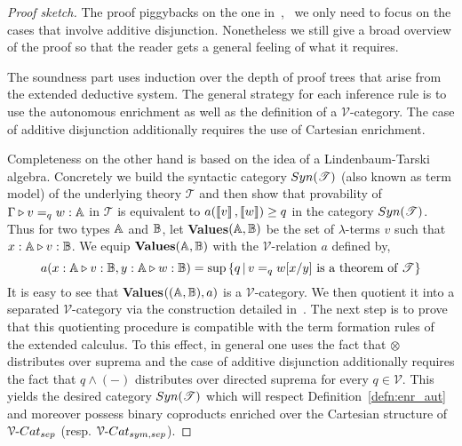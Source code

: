 \documentclass[a4paper,UKenglish,cleveref, autoref, thm-restate]{lipics-v2021}
\begin{document}
\begin{proof}[Proof sketch]
        The proof piggybacks on the one
        in~\cite{dahlqvist22,dahlqvist2023syntactic}, \ie\ we only
        need to focus on the cases that involve additive disjunction.
        Nonetheless we still give a broad overview of the proof so that the
        reader gets a general feeling of what it requires.

        The soundness part uses induction over the depth of proof trees that
        arise from the extended deductive system. The general strategy for each
        inference rule is to use the autonomous enrichment as well as the
        definition of a $\mathcal{V}$-category.  The case of additive
        disjunction additionally requires the use of Cartesian enrichment.

        Completeness on the other hand is based on the idea of a
        Lindenbaum-Tarski algebra. Concretely we build the syntactic category
        $\catfont{Syn}(\mathscr{T})$ (also known as term model) of the
        underlying  theory $\mathscr{T}$ and then show that provability of
        $\Gamma \triangleright v =_q w : \mathbb{A}$ in $\mathscr{T}$ is equivalent to
        $a(\left \llbracket v \right \rrbracket,\left \llbracket w \right \rrbracket) \geq q$ in the category
        $\catfont{Syn}(\mathscr{T})$. Thus for two types $\mathbb{A}$ and $\mathbb{B}$,
        let \textbf{Values}$(\mathbb{A},\mathbb{B})$ be the set of $\lambda$-terms $v$
        such that $x : \mathbb{A} \triangleright v : \mathbb{B}$. We equip
        $\textbf{Values}(\mathbb{A},\mathbb{B})$ with the $\mathcal{V}$-relation $a$
        defined by,
        \[
                        a(x : \mathbb{A} \triangleright v : \mathbb{B}, y : \mathbb{A} \triangleright  w : \mathbb{B})
                        =\sup {\{q \, \vert \,
                        v=_q w[x/y] \text{ is a theorem of } \mathscr{T} \}}
        \]
        It is easy to see that \textbf{Values}$((\mathbb{A},\mathbb{B}),a)$ is a
        $\mathcal{V}$-category. We then quotient it into a separated
        $\mathcal{V}$-category via the construction detailed
        in~\cite{dahlqvist22,dahlqvist2023syntactic}. The next step is to prove
        that this quotienting procedure is compatible with the term formation
        rules of the extended calculus. To this effect, in general one uses the
        fact that $\otimes$ distributes over suprema and the case of additive
        disjunction additionally requires the fact that $q \wedge (-)$
        distributes over directed suprema for every $q \in \mathcal{V}$. This
        yields the desired category $\catfont{Syn}(\mathscr{T})$ which will
        respect Definition~\ref{defn:enr_aut} and moreover possess binary
        coproducts enriched over the Cartesian structure of $\VCatSe$ (resp.
        $\VCatSS$).


\end{proof}
\end{document}
